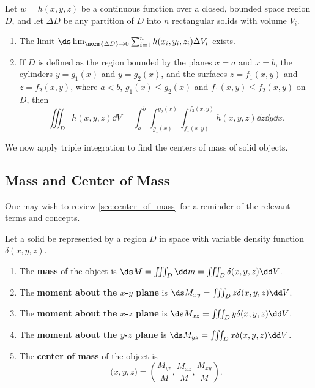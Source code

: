 \begin{theorem}\label{thm:triple_integration2}%
Let $w=h(x,y,z)$ be a continuous function over a closed, bounded space region $D$, and let $\Delta D$ be any partition of $D$ into $n$ rectangular solids with volume $V_i$.

\begin{enumerate}
\item		The limit $\ds \lim_{\norm{\Delta D}\to 0}\sum_{i=1}^n h(x_i,y_i,z_i)\Delta V_i$ exists.

\item		If $D$ is defined as the region bounded by the planes $x=a$ and $x=b$, the cylinders $y=g_1(x)$ and $y=g_2(x)$, and the surfaces $z=f_1(x,y)$ and $z=f_2(x,y)$, where $a<b$, $g_1(x)\leq g_2(x)$ and $f_1(x,y)\leq f_2(x,y)$ on $D$, then
	\[\iiint_D h(x,y,z)\dd V = \int_a^b\int_{g_1(x)}^{g_2(x)}\int_{f_1(x,y)}^{f_2(x,y)} h(x,y,z)\dd z\dd y\dd x.\]
\end{enumerate}
\end{theorem}

We now apply triple integration to find the centers of mass of solid objects.

\subsection{Mass and Center of Mass}

One may wish to review \autoref{sec:center_of_mass} for a reminder of the relevant terms and concepts. 

\begin{definition}\label{def:mass_3d}%
Let a solid be represented by a region $D$ in space with variable density function $\delta(x,y,z)$. 
\begin{enumerate}
	\item The \textbf{mass} of the object is $\ds M= \iiint_D \dd m=\iiint_D \delta(x,y,z)\dd V$.
	\item	The \textbf{moment about the $x$-$y$ plane} is $\ds M_{xy}=\iiint_D z\delta(x,y,z)\dd V$.
	\item	The \textbf{moment about the $x$-$z$ plane} is $\ds M_{xz}=\iiint_D y\delta(x,y,z)\dd V$.
	\item	The \textbf{moment about the $y$-$z$ plane} is $\ds M_{yz}=\iiint_D x\delta(x,y,z)\dd V$.
	\item The \textbf{center of mass} of the object is
	\[\bigl(\overline{x},\overline{y},\overline{z}\bigr) = \left(\frac{M_{yz}}M,\frac{M_{xz}}M,\frac{M_{xy}}M\right).\]
\end{enumerate}
\end{definition}

